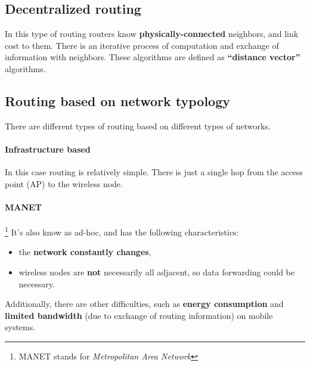 \subsection{Decentralized routing}
In this type of routing routers know \textbf{physically-connected} neighbors,
and link cost to them.
There is an iterative process of computation and exchange of information with
neighbors.
These algorithms are defined as \textbf{``distance vector''} algorithms.

\subsection{Routing based on network typology}

There are different types of routing based on different types of networks.

\paragraph*{Infrastructure based} In this case routing is relatively simple.
There is just a single hop from the access point (AP) to the wireless node.

\paragraph*{MANET}\footnote{MANET stands for \textit{Metropolitan Area
    Network}} It's also know as ad-hoc, and has the following
characteristics:
\begin{itemize}
\item the \textbf{network constantly changes},
\item wireless nodes are \textbf{not} necessarily all adjacent, so data forwarding
  could be necessary.
\end{itemize}
Additionally, there are other difficulties, such as \textbf{energy consumption}
and \textbf{limited bandwidth} (due to exchange of routing information)
on mobile systems.

